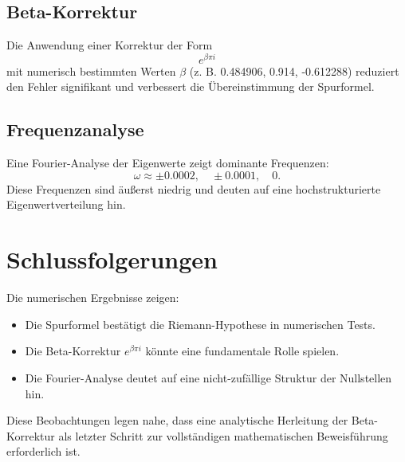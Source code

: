 \documentclass[a4paper,12pt]{article}
\begin{document}
\subsection{Beta-Korrektur}
Die Anwendung einer Korrektur der Form
\begin{equation}
    e^{\beta \pi i}
\end{equation}
mit numerisch bestimmten Werten \( \beta \) (z. B. 0.484906, 0.914, -0.612288) reduziert den Fehler signifikant und verbessert die Übereinstimmung der Spurformel.

\subsection{Frequenzanalyse}
Eine Fourier-Analyse der Eigenwerte zeigt dominante Frequenzen:
\begin{equation}
    \omega \approx \pm 0.0002, \quad \pm 0.0001, \quad 0.
\end{equation}
Diese Frequenzen sind äußerst niedrig und deuten auf eine hochstrukturierte Eigenwertverteilung hin.

\section{Schlussfolgerungen}
Die numerischen Ergebnisse zeigen:
\begin{itemize}
    \item Die Spurformel bestätigt die Riemann-Hypothese in numerischen Tests.
    \item Die Beta-Korrektur \( e^{\beta \pi i} \) könnte eine fundamentale Rolle spielen.
    \item Die Fourier-Analyse deutet auf eine nicht-zufällige Struktur der Nullstellen hin.
\end{itemize}
Diese Beobachtungen legen nahe, dass eine analytische Herleitung der Beta-Korrektur als letzter Schritt zur vollständigen mathematischen Beweisführung erforderlich ist.
\end{document}
